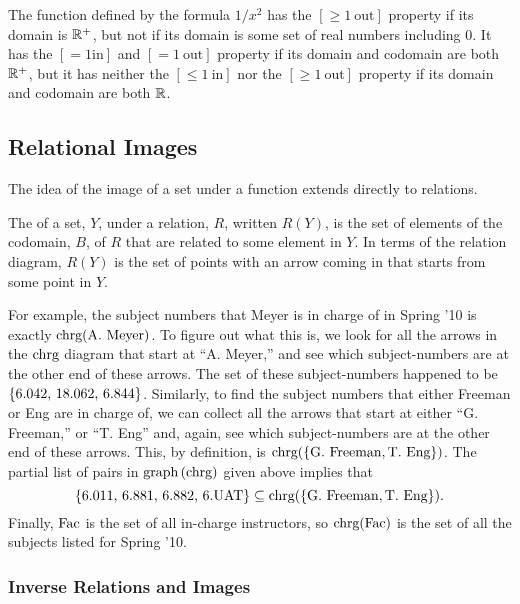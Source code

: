 \begin{example}
  The function defined by the formula $1/x^2$ has the $[\ge 1\
  \text{out}]$ property if its domain is $\mathbb{R}^+$, but not if its domain
  is some set of real numbers including 0.  It has the $[=1 \text{in}]$
  and $[=1\ \text{out}]$ property if its domain and codomain are both
  $\mathbb{R}^+$, but it has neither the $[\le 1\ \text{in}]$ nor the $[\ge 1\
  \text{out}]$ property if its domain and codomain are both $\mathbb{R}$.
\end{example}

\subsection{Relational Images}
The idea of the image of a set under a function extends directly to
relations.

\begin{definition}
  The  of a set, $Y$, under a relation, $R$, written $R(Y)$,
  is the set of elements of the codomain, $B$, of $R$ that are related to
  some element in $Y$.  In terms of the relation diagram, $R(Y)$ is the
  set of points with an arrow coming in that starts from some point in $Y$.
\iffalse
, namely,
\[
R(Y) \eqdef \set{b \in B \suchthat yRb \text{ for some } y \in Y}.
\]\fi
\end{definition}

For example, the subject numbers that Meyer is in charge of in Spring
'10 is exactly $\text{chrg}(\text{A. Meyer})$.  To figure out what this
is, we look for all the arrows in the $\text{chrg}$ diagram that start at
``A. Meyer,'' and see which subject-numbers are at the other end of
these arrows.  The set of these subject-numbers happened to be
$\left\{\text{6.042, 18.062, 6.844}\right\}$.  Similarly, to find the subject
numbers that either Freeman or Eng are in charge of, we can collect
all the arrows that start at either ``G. Freeman,'' or ``T. Eng'' and,
again, see which subject-numbers are at the other end of these arrows.
This, by definition, is $\text{chrg}(\left\{\text{G. Freeman},
  \text{T. Eng}\right\})$.  The partial list of pairs in $\mathop{\textup{graph}}\nolimits\left(\text{chrg}\right)$
given above implies that
\[
\left\{\text{6.011, 6.881, 6.882, 6.UAT}\right\} \subseteq
\text{chrg}(\left\{\text{G. Freeman}, \text{T. Eng}\right\}).
\]
Finally, $\text{Fac}$ is the set of all in-charge instructors, so
$\text{chrg}(\text{Fac})$ is the set of all the subjects listed for Spring '10.

\subsubsection{Inverse Relations and Images}

